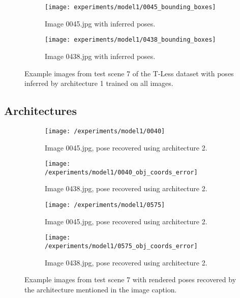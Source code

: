 \begin{figure}[!tbp]
	\begin{subfigure}[t]{0.47\textwidth}
		\centering
    	\texttt{[image: experiments/model1/0045\_bounding\_boxes]}
    	\caption{Image 0045.jpg with inferred poses.}
	\end{subfigure} 
	\hfill
	\begin{subfigure}[t]{0.47\textwidth}
		\centering
    	\texttt{[image: experiments/model1/0438\_bounding\_boxes]}
    	\caption{Image 0438.jpg with inferred poses.}
	\end{subfigure} 
	\caption{Example images from test scene 7 of the T-Less dataset with poses inferred by architecture 1 trained on all images.}
	\label{fig:architecture_experiments_example_frames}
\end{figure} 

\subsection{Architectures} \label{subsection:architectures}

\begin{figure}[!tbp]
	\centering
	\vspace{5mm}
	\begin{subfigure}[t]{0.22\textwidth}
		\centering
    	\texttt{[image: /experiments/model1/0040]}
    	\caption{Image 0045.jpg, pose recovered using architecture 2.}
	\end{subfigure}
	\hfill
	\begin{subfigure}[t]{0.22\textwidth}
		\centering
    	\texttt{[image: /experiments/model1/0040\_obj\_coords\_error]}
    	\caption{Image 0438.jpg, pose recovered using architecture 2.}
	\end{subfigure}
	\begin{subfigure}[t]{0.22\textwidth}
		\centering
    	\texttt{[image: /experiments/model1/0575]}
    	\caption{Image 0045.jpg, pose recovered using architecture 2.}
	\end{subfigure}
	\hfill
	\begin{subfigure}[t]{0.22\textwidth}
		\centering
    	\texttt{[image: /experiments/model1/0575\_obj\_coords\_error]}
    	\caption{Image 0438.jpg, pose recovered using architecture 2.}
	\end{subfigure}
	\caption{Example images from test scene 7 with rendered poses recovered by the architecture mentioned in the image caption.}
	\label{fig:appendix_architecture_comparison_example_frames}
\end{figure}


